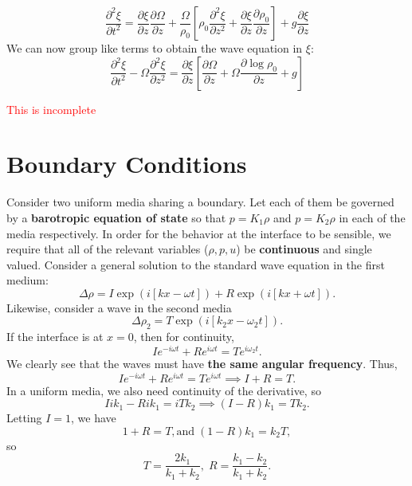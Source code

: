 \[
\frac{\partial ^2 \xi}{\partial t^2} = \frac{\partial \xi}{\partial z} \frac{\partial \Omega}{\partial z} + \frac{\Omega}{\rho_0} \left[\rho_0 \frac{\partial^2 \xi}{\partial z^2} + \frac{\partial \xi}{\partial z} \frac{\partial \rho_0}{\partial z}\right] + g\frac{\partial \xi}{\partial z}
\]
We can now group like terms to obtain the wave equation in $\xi$:
\begin{equation}
    \frac{\partial^2\xi}{\partial t^2} - \Omega \frac{\partial^2\xi}{\partial z^2} = \frac{\partial \xi}{\partial z} \left[\frac{\partial \Omega}{\partial z} + \Omega\frac{\partial \log \rho_0}{\partial z}+g\right]
\end{equation}

\textcolor{red}{This is incomplete}

\section{Boundary Conditions}
Consider two uniform media sharing a boundary. Let each of them be governed by a \textbf{barotropic equation of state} so that $p = K_1\rho$ and $p = K_2 \rho$ in each of the media respectively. In order for the behavior at the interface to be sensible, we require that all of the relevant variables ($\rho, p, u$) be \textbf{continuous} and single valued. Consider a general solution to the standard wave equation in the first medium:
\[
\Delta \rho = I \exp(i[kx-\omega t]) + R\exp(i[kx+\omega t]).
\]
Likewise, consider a wave in the second media 
\[
\Delta \rho_2 = T \exp(i[k_2x-\omega_2t]).
\]
If the interface is at $x=0$, then for continuity,
\[
I e^{-i\omega t} + Re^{i\omega t} = Te^{i\omega_2t}.
\]
We clearly see that the waves must have \textbf{the same angular frequency}. Thus,
\[
Ie^{-i\omega t} + Re^{i\omega t} = Te^{i\omega t} \implies I + R = T.
\]
In a uniform media, we also need continuity of the derivative, so
\[
Iik_1 -Rik_1 = iTk_2 \implies (I-R)k_1 = Tk_2.
\]
Letting $I = 1$, we have
\[
1+R = T, \text{and}\;(1-R)k_1 = k_2T,
\]
so
\[
T = \frac{2k_1}{k_1+k_2},\; R= \frac{k_1-k_2}{k_1+k_2}.
\]